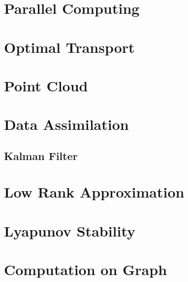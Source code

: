 \section{Parallel Computing}



\section{Optimal Transport}
\newpage
\section{Point Cloud}


\section{Data Assimilation}
\subsection{Kalman Filter}
\section{Low Rank Approximation}

\section{Lyapunov Stability}

\section{Computation on Graph}

